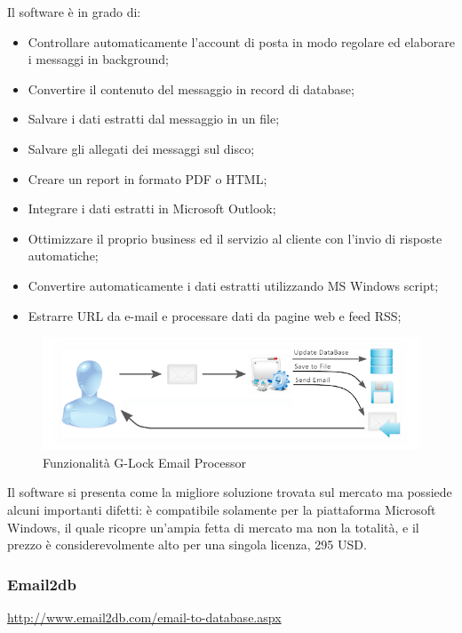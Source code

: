 Il software è in grado di:
\begin{itemize}
\item Controllare automaticamente l'account di posta in modo regolare ed elaborare i messaggi in background;
\item Convertire il contenuto del messaggio in record di database;
\item Salvare i dati estratti dal messaggio in un file;
\item Salvare gli allegati dei messaggi sul disco;
\item Creare un report in formato PDF o HTML;
\item Integrare i dati estratti in Microsoft Outlook;
\item Ottimizzare il proprio business ed il servizio al cliente con l'invio di risposte automatiche;
\item Convertire automaticamente i dati estratti utilizzando MS Windows script;
\item Estrarre URL da e-mail e processare dati da pagine web e feed RSS;
\end{itemize}

\begin{figure}[H]
\centering 
\includegraphics[scale=2]{img/emailprocessor.png} 
\caption{Funzionalità G-Lock Email Processor}
\end{figure}

Il software si presenta come la migliore soluzione trovata sul mercato ma possiede alcuni importanti difetti: è compatibile solamente per la piattaforma Microsoft Windows, il quale ricopre un'ampia fetta di mercato ma non la totalità, e il prezzo è considerevolmente alto per una singola licenza, 295 USD.
\newpage

\subsubsection{Email2db}
\url{http://www.email2db.com/email-to-database.aspx}

